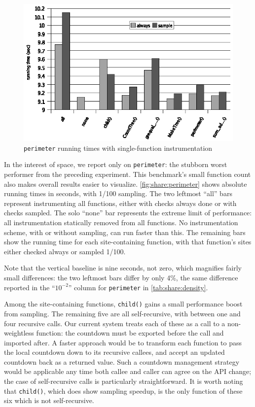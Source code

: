 \begin{figure}
  \centering
  \includegraphics[width=\columnwidth]{applications/perimeter}
  \caption{\texttt{perimeter} running times with single-function
    instrumentation}
  \label{fig:share:perimeter}
\end{figure}

In the interest of space, we report only on \texttt{perimeter}: the
stubborn worst performer from the preceding experiment.  This
benchmark's small function count also makes overall results easier to
visualize.  \autoref{fig:share:perimeter} shows absolute running times
in seconds, with 1/100 sampling.  The two leftmost ``all'' bars
represent instrumenting all functions, either with checks always done
or with checks sampled.  The solo ``none'' bar represents the extreme
limit of performance: all instrumentation statically removed from all
functions.  No instrumentation scheme, with or without sampling, can
run faster than this.  The remaining bars show the running time for
each site-containing function, with that function's sites either
checked always or sampled 1/100.

Note that the vertical baseline is nine seconds, not zero, which
magnifies fairly small differences: the two leftmost bars differ by
only 4\%, the same difference reported in the ``$10^{-2}$'' column for
\texttt{perimeter} in \autoref{tab:share:density}.

Among the site-containing functions, \texttt{child()} gains a small
performance boost from sampling.  The remaining five are all
self-recursive, with between one and four recursive calls.  Our
current system treats each of these as a call to a non-weightless
function: the countdown must be exported before the call and imported
after.  A faster approach would be to transform each function to pass
the local countdown down to its recursive callees, and accept an
updated countdown back as a returned value.  Such a countdown
management strategy would be applicable any time both callee and
caller can agree on the API change; the case of self-recursive calls
is particularly straightforward.  It is worth noting that
\texttt{child()}, which does show sampling speedup, is the only
function of these six which is not self-recursive.

